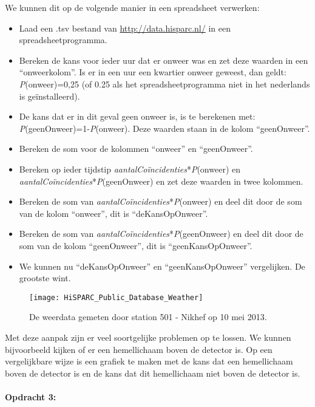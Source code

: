 We kunnen dit op de volgende manier in een spreadsheet verwerken:
\begin{itemize}
\item Laad een .tsv bestand van \url{http://data.hisparc.nl/} in een spreadsheetprogramma.
\item Bereken de kans voor ieder uur dat er onweer was en zet deze waarden
in een ``onweerkolom''. Is er in een uur een kwartier onweer geweest,
dan geldt: \emph{P}(onweer)=0,25 (of 0.25 als het spreadsheetprogramma
niet in het nederlands is geïnstalleerd).
\item De kans dat er in dit geval geen onweer is, is te berekenen met: \emph{P}(geenOnweer)=1-\emph{P}(onweer).
Deze waarden staan in de kolom ``geenOnweer''.
\item Bereken de som voor de kolommen ``onweer'' en ``geenOnweer''.
\item Bereken op ieder tijdstip \emph{aantalCoïncidenties}{*}\emph{P}(onweer)
en \emph{aantalCoïncidenties}{*}\emph{P}(geenOnweer) en zet deze waarden
in twee kolommen.
\item Bereken de som van \emph{aantalCoïncidenties}{*}\emph{P}(onweer) en
deel dit door de som van de kolom ``onweer'', dit is ``deKansOpOnweer''.
\item Bereken de som van \emph{aantalCoïncidenties}{*}\emph{P}(geenOnweer)
en deel dit door de som van de kolom ``geenOnweer'', dit is ``geenKansOpOnweer''.
\item We kunnen nu ``deKansOpOnweer'' en ``geenKansOpOnweer'' vergelijken.
De grootste wint.
\end{itemize}
\begin{figure}[h]
\noindent \begin{centering}
\texttt{[image: HiSPARC\_Public\_Database\_Weather]}
\par\end{centering}

\caption{De weerdata gemeten door station 501 - Nikhef op 10 mei 2013.}
\end{figure}


Met deze aanpak zijn er veel soortgelijke problemen op te lossen.
We kunnen bijvoorbeeld kijken of er een hemellichaam boven de detector
is. Op een vergelijkbare wijze is een grafiek te maken met de kans
dat een hemellichaam boven de detector is en de kans dat dit hemellichaam
niet boven de detector is.


\paragraph*{Opdracht 3:}

